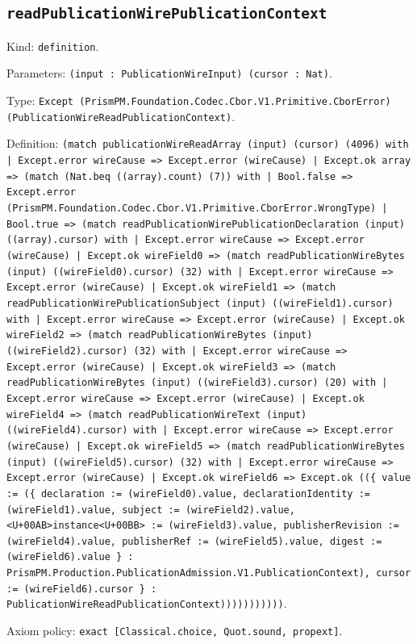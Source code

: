 \documentclass[11pt]{article}
\begin{document}
\subsection*{\texttt{readPublicationWirePublicationContext}}
\noindent Kind: \texttt{definition}.\par
\noindent Parameters: \texttt{(input : PublicationWireInput) (cursor : Nat)}.\par
\noindent Type: \texttt{Except (PrismPM.Foundation.Codec.Cbor.V1.Primitive.CborError) (PublicationWireReadPublicationContext)}.\par
\noindent Definition: \texttt{(match publicationWireReadArray (input) (cursor) (4096) with | Except.error wireCause => Except.error (wireCause) | Except.ok array => (match (Nat.beq ((array).count) (7)) with | Bool.false => Except.error (PrismPM.Foundation.Codec.Cbor.V1.Primitive.CborError.WrongType) | Bool.true => (match readPublicationWirePublicationDeclaration (input) ((array).cursor) with | Except.error wireCause => Except.error (wireCause) | Except.ok wireField0 => (match readPublicationWireBytes (input) ((wireField0).cursor) (32) with | Except.error wireCause => Except.error (wireCause) | Except.ok wireField1 => (match readPublicationWirePublicationSubject (input) ((wireField1).cursor) with | Except.error wireCause => Except.error (wireCause) | Except.ok wireField2 => (match readPublicationWireBytes (input) ((wireField2).cursor) (32) with | Except.error wireCause => Except.error (wireCause) | Except.ok wireField3 => (match readPublicationWireBytes (input) ((wireField3).cursor) (20) with | Except.error wireCause => Except.error (wireCause) | Except.ok wireField4 => (match readPublicationWireText (input) ((wireField4).cursor) with | Except.error wireCause => Except.error (wireCause) | Except.ok wireField5 => (match readPublicationWireBytes (input) ((wireField5).cursor) (32) with | Except.error wireCause => Except.error (wireCause) | Except.ok wireField6 => Except.ok ((\{ value := (\{ declaration := (wireField0).value, declarationIdentity := (wireField1).value, subject := (wireField2).value, <U+00AB>instance<U+00BB> := (wireField3).value, publisherRevision := (wireField4).value, publisherRef := (wireField5).value, digest := (wireField6).value \} : PrismPM.Production.PublicationAdmission.V1.PublicationContext), cursor := (wireField6).cursor \} : PublicationWireReadPublicationContext)))))))))))}.\par
\noindent Axiom policy: \texttt{exact [Classical.choice, Quot.sound, propext]}.\par
\end{document}
